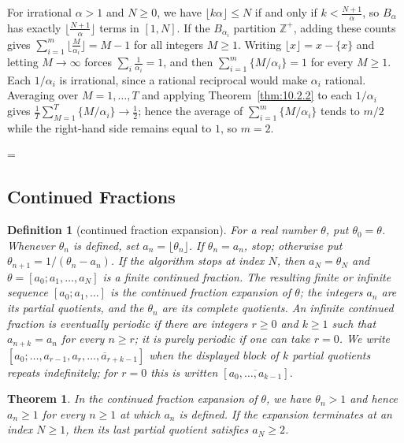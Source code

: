 \documentclass[11pt]{article}
\makeatletter
\theoremstyle{ntstyle}
\newtheorem{theorem}{Theorem}[subsection]
\newtheorem{definition}{Definition}[subsection]
\let\nt@closedisplay\]
\def\nt@guardedclose{\@ifnextchar\par{\nt@closeafterpar}{\@ifnextchar\end{\postdisplaypenalty\@M\nt@closedisplay}{\nt@closedisplay}}}
\def\nt@closeafterpar\par{\@ifnextchar\par{\nt@closeafterpar}{\@ifnextchar\end{\postdisplaypenalty\@M\nt@closedisplay\par}{\nt@closedisplay\par}}}
\renewenvironment{proof}[1][\proofname]{\par
  \pushQED{\qed}\normalfont\topsep\medskipamount\edef\nt@afterproof{\@endparpenalty=\the\@endparpenalty\relax}\@beginparpenalty\@M\@endparpenalty\@M\let\]\nt@guardedclose\trivlist\item[]\textit{#1\@addpunct{.}} \ignorespaces}{\ifvmode\addpenalty\@M\fi\popQED\nt@afterproof\endtrivlist\@endpefalse}
\makeatother
\begin{document}
\begin{proof} For irrational $\alpha>1$ and $N\ge0$,
	we have $\lfloor k\alpha\rfloor\le N$ if and only if $k<\tfrac{N+1}{\alpha}$, so
	$B_\alpha$ has exactly $\big\lfloor\tfrac{N+1}{\alpha}\big\rfloor$
	terms in $[1,N]$. If the $B_{\alpha_i}$ partition $\mathbb{Z}^+$,
	adding these counts gives
	$\sum_{i=1}^{m}\big\lfloor\tfrac{M}{\alpha_i}\big\rfloor=M-1$ for all
	integers $M\ge1$. Writing $\lfloor x\rfloor=x-\{x\}$ and letting
	$M\to\infty$ forces $\sum_i\tfrac{1}{\alpha_i}=1$, and then
	$\sum_{i=1}^{m}\{M/\alpha_i\}=1$ for every $M\ge1$. Each $1/\alpha_i$ is irrational, since a rational reciprocal would make $\alpha_i$ rational. Averaging over $M=1,\ldots,T$ and applying Theorem~\ref{thm:10.2.2} to each $1/\alpha_i$ gives $\tfrac{1}{T}\sum_{M=1}^{T}\{M/\alpha_i\}\to\tfrac{1}{2}$;
	hence the average of $\sum_{i=1}^{m}\{M/\alpha_i\}$ tends to $m/2$ while the right-hand side
	remains equal to $1$, so $m=2$.

\end{proof}
\subsection{Continued Fractions}

\begin{definition}[continued fraction expansion]\label{def:10.3.1}
	For a real number $\theta$, put $\theta_0=\theta$. Whenever $\theta_n$ is
	defined, set $a_n=\lfloor\theta_n\rfloor$. If $\theta_n=a_n$, stop;
	otherwise put $\theta_{n+1}=1/(\theta_n-a_n)$. If the algorithm stops
	at index $N$, then $a_N=\theta_N$ and
	$\theta=[a_0;a_1,\ldots,a_N]$ is a finite continued fraction.
	The resulting finite or infinite sequence $[a_0;a_1,\ldots]$ is the
	continued fraction expansion
	of $\theta$; the integers $a_n$ are its partial quotients, and the $\theta_n$ are its complete quotients. An infinite continued fraction is
	eventually periodic if there are integers $r\ge0$ and $k\ge1$ such that
	$a_{n+k}=a_n$ for every $n\ge r$; it is purely periodic if one can take
	$r=0$. We write
	$[a_0;\ldots,a_{r-1},\overline{a_r,\ldots,a_{r+k-1}}]$ when the displayed
	block of $k$ partial quotients repeats indefinitely; for $r=0$ this is
	written $[\overline{a_0,\ldots,a_{k-1}}]$.

\end{definition}
\begin{theorem}\label{thm:10.3.1}
	In the continued fraction expansion of $\theta$, we have $\theta_n>1$ and
	hence $a_n\ge1$ for every $n\ge1$ at which $a_n$ is defined. If the
	expansion terminates at an index $N\ge1$, then its last partial quotient
	satisfies $a_N\ge2$.

\end{theorem}
\end{document}
